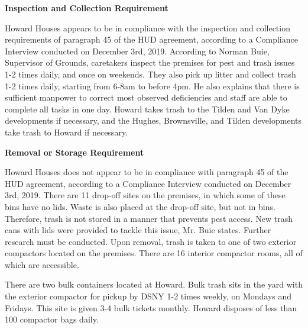 

\textbf{Inspection and Collection Requirement}

Howard Houses appears to be in compliance with the inspection and collection requirements of paragraph 45 of the HUD agreement, according to a Compliance Interview conducted on December 3rd, 2019. According to Norman Buie, Supervisor of Grounds, caretakers inspect the premises for pest and trash issues 1-2 times daily, and once on weekends. They also pick up litter and collect trash 1-2 times daily, starting from 6-8am to before 4pm. He also explains that there is sufficient manpower to correct most observed deficiencies and staff are able to complete all tasks in one day. Howard takes trash to the Tilden and Van Dyke developments if necessary, and the Hughes, Brownsville, and Tilden developments take trash to Howard if necessary.

\textbf{Removal or Storage Requirement} 

Howard Houses does not appear to be in compliance with paragraph 45 of the HUD agreement, according to a Compliance Interview conducted on December 3rd, 2019. There are 11 drop-off sites on the premises, in which some of these bins have no lids. Waste is also placed at the drop-off site, but not in bins. Therefore, trash is not stored in a manner that prevents pest access. New trash cans with lids were provided to tackle this issue, Mr. Buie states. Further research must be conducted. Upon removal, trash is taken to one of two exterior compactors located on the premises. There are 16 interior compactor rooms, all of which are accessible. 

There are two bulk containers located at Howard. Bulk trash sits in the yard with the exterior compactor for pickup by DSNY 1-2 times weekly, on Mondays and Fridays. This site is given 3-4 bulk tickets monthly. Howard disposes of less than 100 compactor bags daily. 